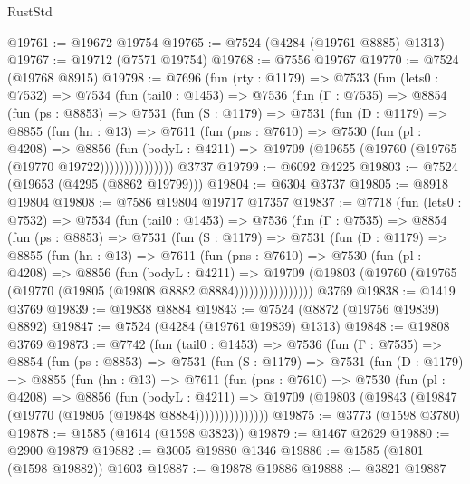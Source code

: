\begin{lexlean}{RustStd}
\begin{coremodule}
@19761 := @19672 @19754
@19765 := @7524 (@4284 (@19761 @8885) @1313)
@19767 := @19712 (@7571 @19754)
@19768 := @7556 @19767
@19770 := @7524 (@19768 @8915)
@19798 := @7696
    (fun (rty : @1179) =>
    @7533
      (fun (lets0 : @7532) =>
      @7534
        (fun (tail0 : @1453) =>
        @7536
          (fun (Γ : @7535) =>
          @8854
            (fun (ps : @8853) =>
            @7531
              (fun (S : @1179) =>
              @7531
                (fun (D : @1179) =>
                @8855
                  (fun (hn : @13) =>
                  @7611
                    (fun (pns : @7610) =>
                    @7530
                      (fun (pl : @4208) =>
                      @8856
                        (fun (bodyL : @4211) =>
                        @19709 (@19655 (@19760 (@19765 (@19770 @19722)))))))))))))))
    @3737
@19799 := @6092 @4225
@19803 := @7524 (@19653 (@4295 (@8862 @19799)))
@19804 := @6304 @3737
@19805 := @8918 @19804
@19808 := @7586 @19804 @19717 @17357
@19837 := @7718
    (fun (lets0 : @7532) =>
    @7534
      (fun (tail0 : @1453) =>
      @7536
        (fun (Γ : @7535) =>
        @8854
          (fun (ps : @8853) =>
          @7531
            (fun (S : @1179) =>
            @7531
              (fun (D : @1179) =>
              @8855
                (fun (hn : @13) =>
                @7611
                  (fun (pns : @7610) =>
                  @7530
                    (fun (pl : @4208) =>
                    @8856
                      (fun (bodyL : @4211) =>
                      @19709
                        (@19803 (@19760 (@19765 (@19770 (@19805 (@19808 @8882 @8884))))))))))))))))
    @3769
@19838 := @1419 @3769
@19839 := @19838 @8884
@19843 := @7524 (@8872 (@19756 @19839) @8892)
@19847 := @7524 (@4284 (@19761 @19839) @1313)
@19848 := @19808 @3769
@19873 := @7742
    (fun (tail0 : @1453) =>
    @7536
      (fun (Γ : @7535) =>
      @8854
        (fun (ps : @8853) =>
        @7531
          (fun (S : @1179) =>
          @7531
            (fun (D : @1179) =>
            @8855
              (fun (hn : @13) =>
              @7611
                (fun (pns : @7610) =>
                @7530
                  (fun (pl : @4208) =>
                  @8856
                    (fun (bodyL : @4211) =>
                    @19709 (@19803 (@19843 (@19847 (@19770 (@19805 (@19848 @8884)))))))))))))))
@19875 := @3773 (@1598 @3780)
@19878 := @1585 (@1614 (@1598 @3823))
@19879 := @1467 @2629
@19880 := @2900 @19879
@19882 := @3005 @19880 @1346
@19886 := @1585 (@1801 (@1598 @19882)) @1603
@19887 := @19878 @19886
@19888 := @3821 @19887

\end{coremodule}
\end{lexlean}
